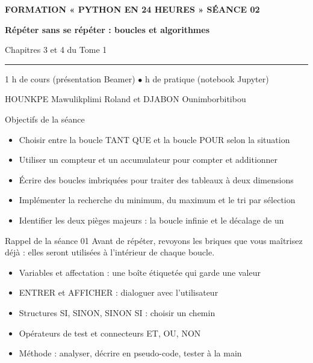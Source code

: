\documentclass[aspectratio=169,11pt]{beamer}
\begin{document}
{%
\begin{frame}[plain]
\vspace{10mm}
{\color{PyJaune}\small\bfseries FORMATION « PYTHON EN 24 HEURES » \quad\textbar\quad SÉANCE 02\par}
\vspace{4mm}
{\color{white}\Huge\bfseries Répéter sans se répéter : boucles et algorithmes\par}
\vspace{4mm}
{\color{PyBleuClair}\large Chapitres 3 et 4 du Tome 1\par}
\vspace{7mm}
{\color{PyJaune}\rule{34mm}{2.2pt}\par}
\vspace{7mm}
{\color{white}\normalsize 1 h de cours (présentation Beamer) \quad$\bullet$ h de pratique (notebook Jupyter)\par}
\vspace{2.5mm}
{\color{PyBleuClair}\normalsize HOUNKPE Mawulikplimi Roland et DJABON Ounimborbitibou\par}
\end{frame}
}
\begin{frame}{Objectifs de la séance}
\begin{itemize}
  \item Choisir entre la boucle TANT QUE et la boucle POUR selon la situation
  \item Utiliser un compteur et un accumulateur pour compter et additionner
  \item Écrire des boucles imbriquées pour traiter des tableaux à deux dimensions
  \item Implémenter la recherche du minimum, du maximum et le tri par sélection
  \item Identifier les deux pièges majeurs : la boucle infinie et le décalage de un
\end{itemize}
\end{frame}
\begin{frame}{Rappel de la séance 01}
Avant de répéter, revoyons les briques que vous maîtrisez déjà : elles seront utilisées à l'intérieur de chaque boucle.

\begin{itemize}
  \item Variables et affectation : une boîte étiquetée qui garde une valeur
  \item ENTRER et AFFICHER : dialoguer avec l'utilisateur
  \item Structures SI, SINON, SINON SI : choisir un chemin
  \item Opérateurs de test et connecteurs ET, OU, NON
  \item Méthode : analyser, décrire en pseudo-code, tester à la main
\end{itemize}
\end{frame}
\end{document}
